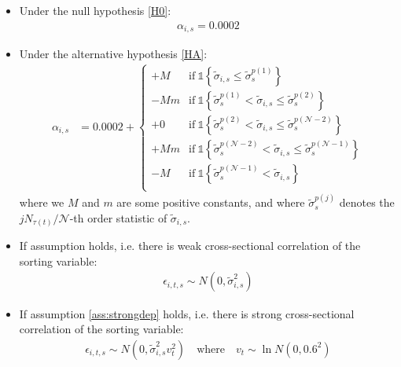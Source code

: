 \begin{itemize}
    \item Under the null hypothesis \eqref{H0}:
    \begin{align*}
        \alpha_{i,s} = 0.0002
    \end{align*}
    \item Under the alternative hypothesis \eqref{HA}:
    \begin{align*}
        \alpha_{i,s} &= 
        0.0002 +
        \begin{cases}
            + M & \text{if} \ \mathds{1} \left\{ \widetilde{\sigma}_{i,s} \leq \widetilde{\sigma}_s^{p(1)} \right\} \\
            - M m & \text{if} \ \mathds{1} \left\{ \widetilde{\sigma}_s^{p(1)} < \widetilde{\sigma}_{i,s} \leq \widetilde{\sigma}_s^{p(2)} \right\} \\
            + 0 & \text{if} \ \mathds{1} \left\{ \widetilde{\sigma}_s^{p(2)} < \widetilde{\sigma}_{i,s} \leq \widetilde{\sigma}_s^{p(\mathcal{N}-2)} \right\} \\
            + M m & \text{if} \ \mathds{1} \left\{ \widetilde{\sigma}_s^{p(\mathcal{N}-2)} < \widetilde{\sigma}_{i,s} \leq \widetilde{\sigma}_s^{p(\mathcal{N}-1)} \right\} \\
            - M & \text{if} \ \mathds{1} \left\{ \widetilde{\sigma}_s^{p(\mathcal{N}-1)} < \widetilde{\sigma}_{i,s} \right\} \\
        \end{cases}
    \end{align*}
    where we $M$ and $m$ are some positive constants, and where $\widetilde{\sigma}_s^{p(j)}$ denotes the $jN_{\tau(t)}/\mathcal{N}$-th order statistic of $\widetilde{\sigma}_{i,s}$.
    \item If assumption  holds, i.e. there is weak cross-sectional correlation of the sorting variable:
    \begin{align*}
        \epsilon_{i,t,s} \sim N \left( 0, \widetilde{\sigma}_{i,s}^2 \right)
    \end{align*}
    \item If assumption \ref{ass:strongdep} holds, i.e. there is strong cross-sectional correlation of the sorting variable:
    \begin{align*}
        \epsilon_{i,t,s} \sim N \left( 0, \widetilde{\sigma}_{i,s}^2 v_t^2 \right) \quad \text{where} \quad v_t \sim \ln N \left(0, 0.6^2 \right)
    \end{align*}
\end{itemize}
